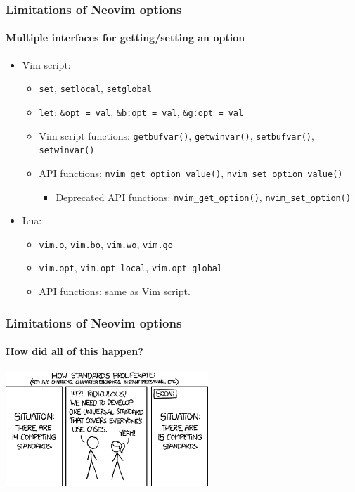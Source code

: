 \documentclass[10pt]{beamer}
\begin{document}
\begin{frame}
\frametitle{Limitations of Neovim options}
\framesubtitle{Multiple interfaces for getting/setting an option}
\begin{itemize}
    \item Vim script:
    \begin{itemize}
        \item \lstinline{set}, \lstinline{setlocal}, \lstinline{setglobal}
        \item \lstinline{let}: \lstinline{&opt = val}, \lstinline{&b:opt = val},
        \lstinline{&g:opt = val}
        \item Vim script functions: \lstinline{getbufvar()}, \lstinline{getwinvar()},
        \lstinline{setbufvar()}, \lstinline{setwinvar()}
        \item API functions: \lstinline{nvim_get_option_value()},
        \lstinline{nvim_set_option_value()}
        \begin{itemize}
            \item Deprecated API functions: \lstinline{nvim_get_option()},
            \lstinline{nvim_set_option()}
        \end{itemize}
    \end{itemize}
    \item Lua:
    \begin{itemize}
        \item \lstinline{vim.o}, \lstinline{vim.bo}, \lstinline{vim.wo}, \lstinline{vim.go}
        \item \lstinline{vim.opt}, \lstinline{vim.opt_local}, \lstinline{vim.opt_global}
        \item API functions: same as Vim script.
    \end{itemize}
\end{itemize}
\end{frame}
\begin{frame}
\frametitle{Limitations of Neovim options}
\framesubtitle{How did all of this happen?}
\begin{center}
\includegraphics[keepaspectratio=true, width=3in]{images/xkcd_competing_standards.png}
\end{center}
\end{frame}
\end{document}

